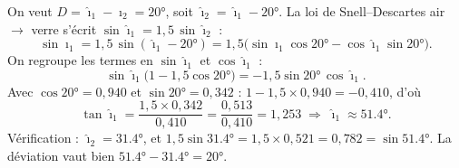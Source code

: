 \documentclass[11pt,a4paper]{article}
\begin{document}
\begin{corrige}
On veut $D=\hat{\imath}_1-\hat{\imath}_2=\ang{20}$, soit $\hat{\imath}_2=\hat{\imath}_1-\ang{20}$.
La loi de Snell–Descartes air $\to$ verre s'écrit $\sin\hat{\imath}_1=1{,}5\,\sin\hat{\imath}_2$ :
\[ \sin\hat{\imath}_1=1{,}5\,\sin(\hat{\imath}_1-\ang{20})
   =1{,}5\big(\sin\hat{\imath}_1\cos\ang{20}-\cos\hat{\imath}_1\sin\ang{20}\big). \]
On regroupe les termes en $\sin\hat{\imath}_1$ et $\cos\hat{\imath}_1$ :
\[ \sin\hat{\imath}_1\big(1-1{,}5\cos\ang{20}\big)=-1{,}5\sin\ang{20}\,\cos\hat{\imath}_1. \]
Avec $\cos\ang{20}=0{,}940$ et $\sin\ang{20}=0{,}342$ : $1-1{,}5\times0{,}940=-0{,}410$, d'où
\[ \tan\hat{\imath}_1=\frac{1{,}5\times0{,}342}{0{,}410}=\frac{0{,}513}{0{,}410}=1{,}253
   \;\Longrightarrow\;\boxed{\hat{\imath}_1\approx\ang{51.4}}. \]
Vérification : $\hat{\imath}_2=\ang{31.4}$, et $1{,}5\sin\ang{31.4}=1{,}5\times0{,}521=0{,}782
=\sin\ang{51.4}$. La déviation vaut bien $\ang{51.4}-\ang{31.4}=\ang{20}$.
\end{corrige}
\end{document}
